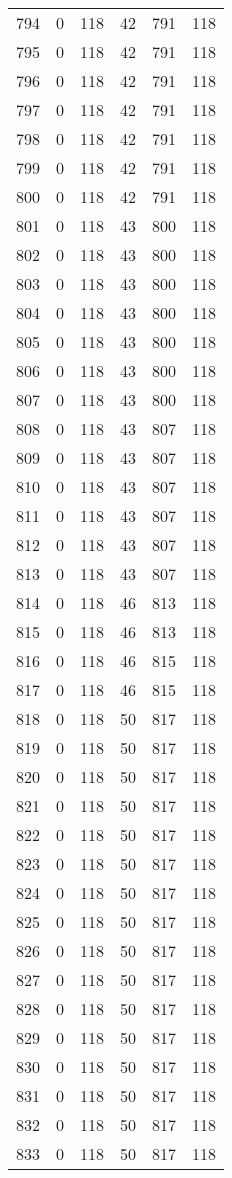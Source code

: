 \documentclass[a4paper]{ctexart}
\begin{document}
\begin{longtable}{p{1cm}|p{2cm}|p{2cm}|p{2cm}|P{2cm}|p{2cm}}
		794&0&118&42&791&118\\
		795&0&118&42&791&118\\
		796&0&118&42&791&118\\
		797&0&118&42&791&118\\
		798&0&118&42&791&118\\
		799&0&118&42&791&118\\
		800&0&118&42&791&118\\
		801&0&118&43&800&118\\
		802&0&118&43&800&118\\
		803&0&118&43&800&118\\
		804&0&118&43&800&118\\
		805&0&118&43&800&118\\
		806&0&118&43&800&118\\
		807&0&118&43&800&118\\
		808&0&118&43&807&118\\
		809&0&118&43&807&118\\
		810&0&118&43&807&118\\
		811&0&118&43&807&118\\
		812&0&118&43&807&118\\
		813&0&118&43&807&118\\
		814&0&118&46&813&118\\
		815&0&118&46&813&118\\
		816&0&118&46&815&118\\
		817&0&118&46&815&118\\
		818&0&118&50&817&118\\
		819&0&118&50&817&118\\
		820&0&118&50&817&118\\
		821&0&118&50&817&118\\
		822&0&118&50&817&118\\
		823&0&118&50&817&118\\
		824&0&118&50&817&118\\
		825&0&118&50&817&118\\
		826&0&118&50&817&118\\
		827&0&118&50&817&118\\
		828&0&118&50&817&118\\
		829&0&118&50&817&118\\
		830&0&118&50&817&118\\
		831&0&118&50&817&118\\
		832&0&118&50&817&118\\
		833&0&118&50&817&118\\

\end{longtable}
\end{document}
